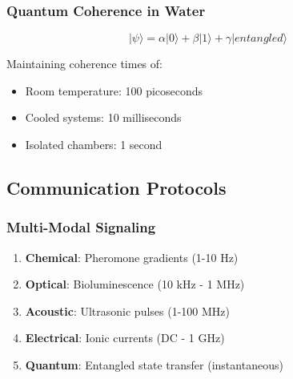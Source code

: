 \documentclass[11pt,a4paper]{article}
\begin{document}
\subsubsection{Quantum Coherence in Water}
\begin{equation}
|\psi\rangle = \alpha|0\rangle + \beta|1\rangle + \gamma|entangled\rangle
\end{equation}

Maintaining coherence times of:
\begin{itemize}
    \item Room temperature: 100 picoseconds
    \item Cooled systems: 10 milliseconds
    \item Isolated chambers: 1 second
\end{itemize}

\subsection{Communication Protocols}

\subsubsection{Multi-Modal Signaling}
\begin{enumerate}
    \item \textbf{Chemical}: Pheromone gradients (1-10 Hz)
    \item \textbf{Optical}: Bioluminescence (10 kHz - 1 MHz)
    \item \textbf{Acoustic}: Ultrasonic pulses (1-100 MHz)
    \item \textbf{Electrical}: Ionic currents (DC - 1 GHz)
    \item \textbf{Quantum}: Entangled state transfer (instantaneous)
\end{enumerate}
\end{document}
